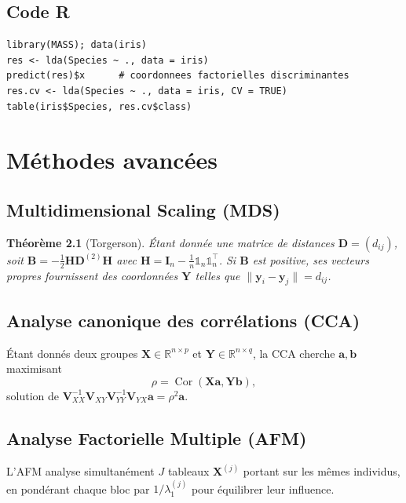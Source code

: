 \documentclass[11pt, a4paper, openany]{book}
\theoremstyle{plain}
\newtheorem{theorem}{Théorème}[chapter]
\theoremstyle{definition}
\theoremstyle{remark}
\newcommand{\R}{\mathbb{R}}
\newcommand{\1}{\mathds{1}}
\DeclareMathOperator{\Cor}{Cor}
\newcommand{\X}{\mathbf{X}}
\newcommand{\V}{\mathbf{V}}
\begin{document}
\section{Code R}
\begin{lstlisting}
library(MASS); data(iris)
res <- lda(Species ~ ., data = iris)
predict(res)$x      # coordonnees factorielles discriminantes
res.cv <- lda(Species ~ ., data = iris, CV = TRUE)
table(iris$Species, res.cv$class)
\end{lstlisting}

\chapter{Méthodes avancées}

\section{Multidimensional Scaling (MDS)}

\begin{theorem}[Torgerson]
Étant donnée une matrice de distances $\mathbf{D} = (d_{ij})$, soit
$\mathbf{B} = -\frac{1}{2} \mathbf{H} \mathbf{D}^{(2)} \mathbf{H}$ avec
$\mathbf{H} = \mathbf{I}_n - \frac{1}{n}\1_n\1_n^\top$. Si $\mathbf{B}$ est
positive, ses vecteurs propres fournissent des coordonnées $\mathbf{Y}$ telles
que $\|\mathbf{y}_i - \mathbf{y}_j\| = d_{ij}$.
\end{theorem}

\section{Analyse canonique des corrélations (CCA)}

Étant donnés deux groupes $\X \in \R^{n \times p}$ et $\mathbf{Y} \in \R^{n \times q}$,
la CCA cherche $\mathbf{a}, \mathbf{b}$ maximisant
\[
\rho = \Cor(\X \mathbf{a}, \mathbf{Y} \mathbf{b}),
\]
solution de $\V_{XX}^{-1} \V_{XY} \V_{YY}^{-1} \V_{YX} \mathbf{a} = \rho^2 \mathbf{a}$.

\section{Analyse Factorielle Multiple (AFM)}

L'AFM analyse simultanément $J$ tableaux $\X^{(j)}$ portant sur les mêmes
individus, en pondérant chaque bloc par $1/\lambda_1^{(j)}$ pour équilibrer
leur influence.
\end{document}
